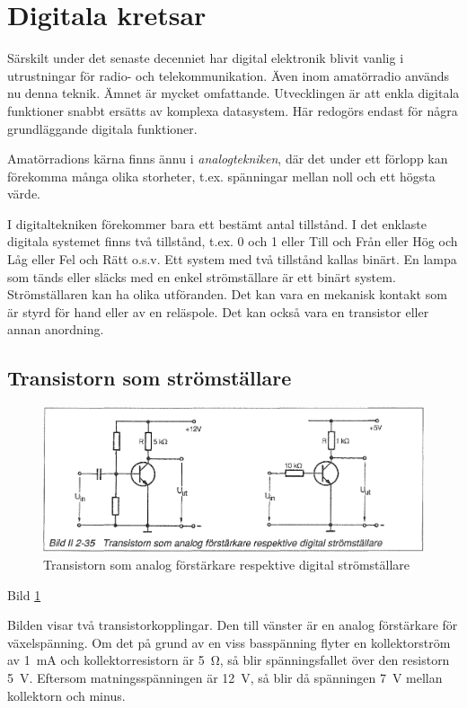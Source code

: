 \section{Digitala kretsar}
\label{digitala kretsar}

Särskilt under det senaste decenniet har digital elektronik blivit vanlig i
utrustningar för radio- och telekommunikation. Även inom amatörradio används nu
denna teknik. Ämnet är mycket omfattande. Utvecklingen är att enkla digitala
funktioner snabbt ersätts av komplexa datasystem. Här redogörs endast för några
grundläggande digitala funktioner.

Amatörradions kärna finns ännu i \emph{analogtekniken}, där det under ett
förlopp kan förekomma många olika storheter, t.ex. spänningar mellan noll och
ett högsta värde.

I digitaltekniken förekommer bara ett bestämt antal tillstånd. I det enklaste
digitala systemet finns två tillstånd, t.ex. 0 och 1 eller Till och Från eller
Hög och Låg eller Fel och Rätt o.s.v. Ett system med två tillstånd kallas
binärt. En lampa som tänds eller släcks med en enkel strömställare är ett binärt
system. Strömställaren kan ha olika utföranden. Det kan vara en mekanisk kontakt
som är styrd för hand eller av en reläspole. Det kan också vara en transistor
eller annan anordning.

\subsection{Transistorn som strömställare}

\begin{figure}
\includegraphics[width=\textwidth]{images/bild_2_2-35}
\caption{Transistorn som analog förstärkare respektive digital strömställare}
\label{fig:BildII2-35}
\end{figure}

Bild \ref{fig:BildII2-35}

Bilden visar två transistorkopplingar. Den till vänster är en analog förstärkare
för växelspänning. Om det på grund av en viss basspänning flyter en
kollektorström av 1~mA och kollektorresistorn är 5~Ω, så blir spänningsfallet
över den resistorn 5~V. Eftersom matningsspänningen är 12~V, så blir då
spänningen 7~V mellan kollektorn och minus.

